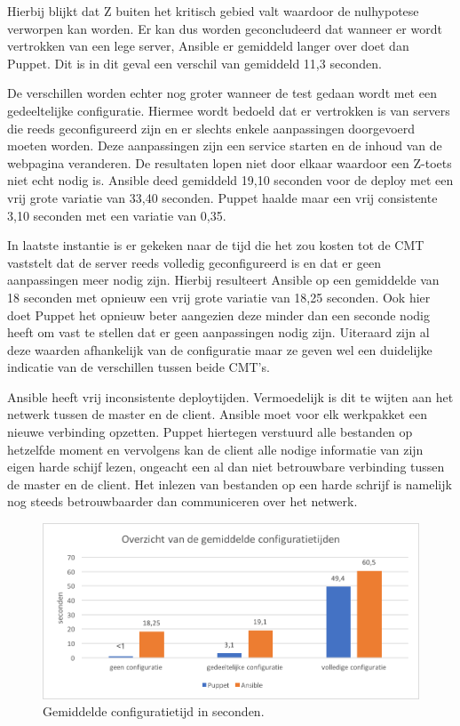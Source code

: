 Hierbij blijkt dat Z buiten het kritisch gebied valt waardoor de nulhypotese verworpen kan worden. Er kan dus worden geconcludeerd dat wanneer er wordt vertrokken van een lege server, Ansible er gemiddeld langer over doet dan Puppet. Dit is in dit geval een verschil van gemiddeld 11,3 seconden. 

De verschillen worden echter nog groter wanneer de test gedaan wordt met een gedeeltelijke configuratie. Hiermee wordt bedoeld dat er vertrokken is van servers die reeds geconfigureerd zijn en er slechts enkele aanpassingen doorgevoerd moeten worden. Deze aanpassingen zijn een service starten en de inhoud van de webpagina veranderen. De resultaten lopen niet door elkaar waardoor een Z-toets niet echt nodig is. Ansible deed gemiddeld 19,10 seconden voor de \gls{deploy} met een vrij grote variatie van 33,40 seconden. Puppet haalde maar een vrij consistente 3,10 seconden met een variatie van 0,35.

In laatste instantie is er gekeken naar de tijd die het zou kosten tot de \gls{CMT} vaststelt dat de server reeds volledig geconfigureerd is en dat er geen aanpassingen meer nodig zijn. Hierbij resulteert Ansible op een gemiddelde van 18 seconden met opnieuw een vrij grote variatie van 18,25 seconden. Ook hier doet Puppet het opnieuw beter aangezien deze minder dan een seconde nodig heeft om vast te stellen dat er geen aanpassingen nodig zijn. Uiteraard zijn al deze waarden afhankelijk van de configuratie maar ze geven wel een duidelijke indicatie van de verschillen tussen beide \gls{CMT}'s.

Ansible heeft vrij inconsistente deploytijden. Vermoedelijk is dit te wijten aan het netwerk tussen de master en de client. Ansible moet voor elk \gls{werkpakket} een nieuwe verbinding opzetten. Puppet hiertegen verstuurd alle bestanden op hetzelfde moment en vervolgens kan de client alle nodige informatie van zijn eigen harde schijf lezen, ongeacht een al dan niet betrouwbare verbinding tussen de master en de client. Het inlezen van bestanden op een harde schrijf is namelijk nog steeds betrouwbaarder dan communiceren over het netwerk.

\begin{figure}
	\includegraphics[width=\linewidth]{img/overzichtgemiddeldeconfigtijd.png} 
	\caption{Gemiddelde configuratietijd in seconden.}  

\end{figure}




